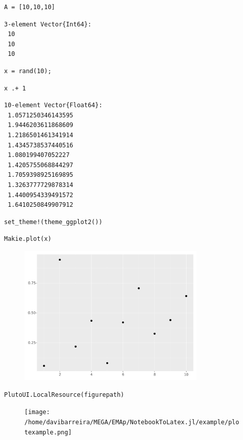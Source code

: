 \begin{lstlisting}[language=JuliaLocal, style=julia]
A = [10,10,10]
\end{lstlisting}

\begin{verbatim}
3-element Vector{Int64}:
 10
 10
 10
\end{verbatim}

\begin{lstlisting}[language=JuliaLocal, style=julia]
x = rand(10);
\end{lstlisting}

\begin{lstlisting}[language=JuliaLocal, style=julia]
x .+ 1
\end{lstlisting}

\begin{verbatim}
10-element Vector{Float64}:
 1.0571250346143595
 1.9446203611868609
 1.2186501461341914
 1.4345738537440516
 1.080199407052227
 1.4205755068844297
 1.7059398925169895
 1.3263777729878314
 1.4400954339491572
 1.6410250849907912
\end{verbatim}

\begin{lstlisting}[language=JuliaLocal, style=julia]
set_theme!(theme_ggplot2())
\end{lstlisting}

\begin{lstlisting}[language=JuliaLocal, style=julia]
Makie.plot(x)
\end{lstlisting}

\begin{figure}[H]
	\centering
	\includegraphics[width=0.8\textwidth]{./figures/examplepluto_figure2.pdf}
	\label{fig:examplepluto_figure2.pdf}

\end{figure}

\begin{lstlisting}[language=JuliaLocal, style=julia]
PlutoUI.LocalResource(figurepath)
\end{lstlisting}

\begin{figure}[H]
	\centering
	\texttt{[image: /home/davibarreira/MEGA/EMAp/NotebookToLatex.jl/example/plotexample.png]}
	\label{fig:/home/davibarreira/MEGA/EMAp/NotebookToLatex.jl/example/plotexample.png}

\end{figure}

